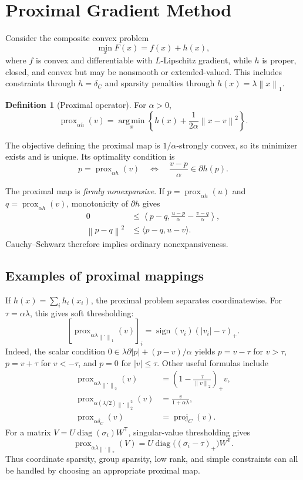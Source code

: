 \documentclass[12pt,oneside]{book}
\numberwithin{equation}{section}
\theoremstyle{definition}
\newtheorem{definition}{Definition}[section]
\theoremstyle{plain}
\theoremstyle{remark}
\newcommand{\argmin}{\operatorname*{arg\,min}}
\newcommand{\norm}[1]{\left\lVert #1 \right\rVert}
\newcommand{\abs}[1]{\left\lvert #1 \right\rvert}
\begin{document}
\section{Proximal Gradient Method}

Consider the composite convex problem
\[
    \min_x F(x)=f(x)+h(x),
\]
where $f$ is convex and differentiable with $L$-Lipschitz gradient, while
$h$ is proper, closed, and convex but may be nonsmooth or extended-valued.
This includes constraints through $h=\delta_C$ and sparsity penalties through
$h(x)=\lambda\norm{x}_1$.

\begin{definition}[Proximal operator]
For $\alpha>0$,
\[
 \operatorname{prox}_{\alpha h}(v)
 =\argmin_x\left\{h(x)+\frac1{2\alpha}\norm{x-v}^2\right\}.
\]
\end{definition}
The objective defining the proximal map is $1/\alpha$-strongly convex, so its
minimizer exists and is unique. Its optimality condition is
\begin{equation}\label{eq:prox-optimality}
 p=\operatorname{prox}_{\alpha h}(v)
 \quad\Longleftrightarrow\quad
 \frac{v-p}{\alpha}\in\partial h(p).
\end{equation}

The proximal map is \emph{firmly nonexpansive}. If
$p=\operatorname{prox}_{\alpha h}(u)$ and
$q=\operatorname{prox}_{\alpha h}(v)$, monotonicity of $\partial h$ gives
\begin{align*}
 0&\leq\left\langle p-q,
 \frac{u-p}{\alpha}-\frac{v-q}{\alpha}\right\rangle,\\
 \norm{p-q}^2&\leq\langle p-q,u-v\rangle.
\end{align*}
Cauchy--Schwarz therefore implies ordinary nonexpansiveness.

\subsection{Examples of proximal mappings}

If $h(x)=\sum_i h_i(x_i)$, the proximal problem separates coordinatewise.
For $\tau=\alpha\lambda$, this gives soft thresholding:
\[
 \left[\operatorname{prox}_{\alpha\lambda\norm{\cdot}_1}(v)\right]_i
 =\operatorname{sign}(v_i)(\abs{v_i}-\tau)_+.
\]
Indeed, the scalar condition
$0\in\lambda\partial\abs p+(p-v)/\alpha$ yields $p=v-\tau$ for
$v>\tau$, $p=v+\tau$ for $v<-\tau$, and $p=0$ for $\abs v\leq\tau$.
Other useful formulas include
\begin{align*}
 \operatorname{prox}_{\alpha\lambda\norm{\cdot}_2}(v)
 &=\left(1-\frac{\tau}{\norm v_2}\right)_+v,\\
 \operatorname{prox}_{\alpha(\lambda/2)\norm{\cdot}_2^2}(v)
 &=\frac{v}{1+\alpha\lambda},\\
 \operatorname{prox}_{\alpha\delta_C}(v)&=\operatorname{proj}_C(v).
\end{align*}
For a matrix $V=U\operatorname{diag}(\sigma_i)W^\mathsf T$, singular-value
thresholding gives
\[
 \operatorname{prox}_{\alpha\lambda\norm{\cdot}_*}(V)
 =U\operatorname{diag}\bigl((\sigma_i-\tau)_+\bigr)W^\mathsf T.
\]
Thus coordinate sparsity, group sparsity, low rank, and simple constraints can
all be handled by choosing an appropriate proximal map.
\end{document}
